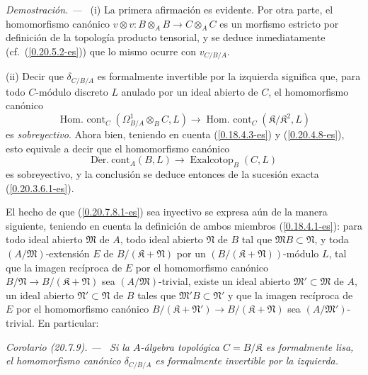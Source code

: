 \documentclass[10pt,oneside]{book}
\makeatletter
\newcommand{\sref}[1]{\textup{(\ref{#1})}}
\newcommand{\setmanualcurrentlabel}[1]{\def\@currentlabel{#1}}
\newcommand{\oldpage}[2][]{%
  \setcounter{footnote}{0}%
  \marginpar{\scriptsize\textbf{#1}~|~#2}\ignorespaces}
\newenvironment{corollary}[1][]{%
  \setmanualcurrentlabel{#1}\par\medskip\noindent\itshape Corolario (#1). ---\ }{\par}
\newenvironment{proof}{%
  \par\medskip\noindent\textit{Demostración. ---\ }}{\par}
\makeatother
\begin{document}
\begin{proof}
(i) La primera afirmación es evidente. Por otra parte, el homomorfismo
canónico $v\otimes v:B\otimes_A B\to C\otimes_A C$ es un morfismo estricto
por definición de la topología producto tensorial, y se deduce inmediatamente
(cf.\ \sref{0.20.5.2-es}) que lo mismo ocurre con $v_{C/B/A}$.

(ii) Decir que $\delta_{C/B/A}$ es formalmente invertible por la izquierda significa
que, para todo $C$-módulo discreto $L$ anulado por un ideal abierto de $C$,
el homomorfismo canónico
\[
  \operatorname{Hom.\ cont}_C(\Omega^1_{B/A}\otimes_B C,L)\to
  \operatorname{Hom.\ cont}_C(\mathfrak K/\mathfrak K^2,L)
\]
es \emph{sobreyectivo}. Ahora bien, teniendo en cuenta \sref{0.18.4.3-es} y
\sref{0.20.4.8-es}, esto equivale a decir que el homomorfismo canónico
\[
  \operatorname{D\acute{e}r.\ cont}_A(B,L)\to
  \operatorname{Exalcotop}_B(C,L)
\]
es sobreyectivo, y la conclusión se deduce entonces de la sucesión exacta
\sref{0.20.3.6.1-es}.

El hecho de que \sref{0.20.7.8.1-es} sea inyectivo se expresa aún de la manera
siguiente, teniendo en cuenta la definición de ambos miembros
\sref{0.18.4.1-es}: para todo ideal abierto $\mathfrak{M}$ de $A$, todo ideal
abierto $\mathfrak{N}$ de $B$ tal que $\mathfrak{M}B\subset\mathfrak{N}$, y
toda $(A/\mathfrak{M})$-extensión $E$ de
$B/(\mathfrak K+\mathfrak{N})$ por un
$(B/(\mathfrak K+\mathfrak{N}))$-módulo $L$, tal que la imagen recíproca de
$E$ por el homomorfismo canónico
$B/\mathfrak{N}\to B/(\mathfrak K+\mathfrak{N})$ sea
$(A/\mathfrak{M})$-trivial, existe un ideal abierto
$\mathfrak{M}'\subset\mathfrak{M}$ de $A$,
\oldpage[0\textsubscript{IV-1}]{150}
un ideal abierto $\mathfrak{N}'\subset\mathfrak{N}$ de $B$ tales que
$\mathfrak{M}'B\subset\mathfrak{N}'$ y que la imagen recíproca de $E$ por
el homomorfismo canónico
$B/(\mathfrak K+\mathfrak{N}')\to B/(\mathfrak K+\mathfrak{N})$ sea
$(A/\mathfrak{M}')$-trivial. En particular:
\end{proof}

\begin{corollary}[20.7.9]
\label{0.20.7.9-es}
Si la $A$-álgebra topológica $C=B/\mathfrak K$ es formalmente lisa,
el homomorfismo canónico $\delta_{C/B/A}$ es formalmente invertible por la
izquierda.
\end{corollary}
\end{document}

